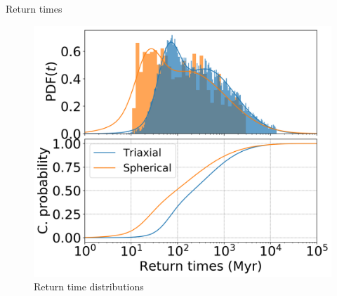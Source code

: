 \documentclass[handout]{beamer}
\begin{document}
\begin{frame}{Return times}
	\begin{figure}[h]
		\centering
		\includegraphics[width = 0.6\linewidth]{"../Files/Week 14/dist_times_slides"}
		\caption{Return time distributions}
		\label{fig: timeDist}
	\end{figure}
\end{frame}
\end{document}
